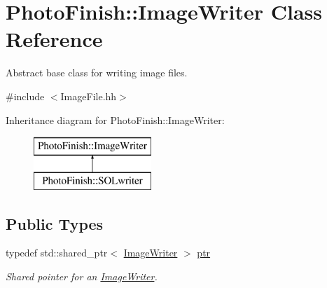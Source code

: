 \hypertarget{class_photo_finish_1_1_image_writer}{}\section{Photo\+Finish\+:\+:Image\+Writer Class Reference}
\label{class_photo_finish_1_1_image_writer}


Abstract base class for writing image files.  




{\ttfamily \#include $<$Image\+File.\+hh$>$}

Inheritance diagram for Photo\+Finish\+:\+:Image\+Writer\+:\begin{figure}[H]
\begin{center}
\leavevmode
\includegraphics[height=2.000000cm]{class_photo_finish_1_1_image_writer}
\end{center}
\end{figure}
\subsection*{Public Types}
\begin{DoxyCompactItemize}
\item 
typedef std\+::shared\+\_\+ptr$<$ \hyperlink{class_photo_finish_1_1_image_writer}{Image\+Writer} $>$ \hyperlink{class_photo_finish_1_1_image_writer_ad09511cf9f26b7cec2ca0fb6ae361aac}{ptr}
\begin{DoxyCompactList}\small\item\em Shared pointer for an \hyperlink{class_photo_finish_1_1_image_writer}{Image\+Writer}. \end{DoxyCompactList}\end{DoxyCompactItemize}
